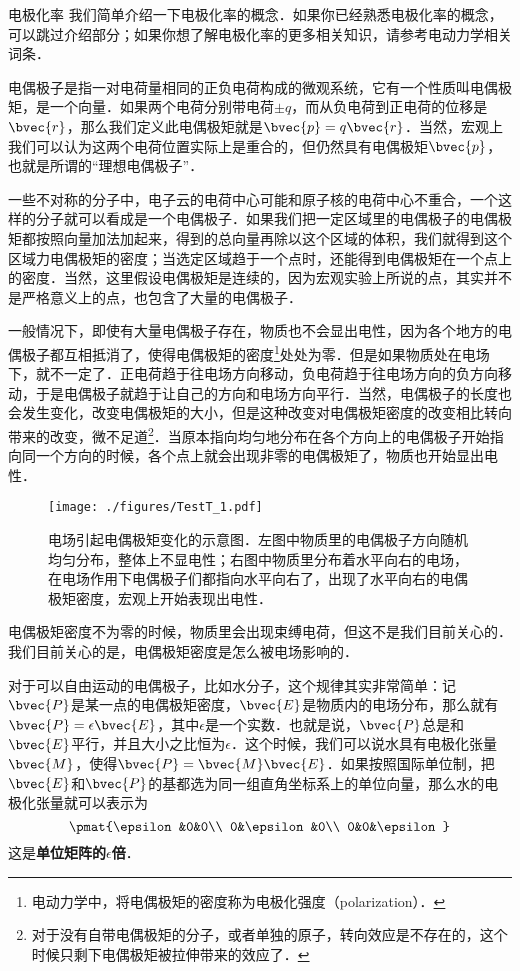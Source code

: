 \begin{example}{电极化率}
我们简单介绍一下电极化率的概念．如果你已经熟悉电极化率的概念，可以跳过介绍部分；如果你想了解电极化率的更多相关知识，请参考电动力学相关词条．

电偶极子是指一对电荷量相同的正负电荷构成的微观系统，它有一个性质叫电偶极矩，是一个向量．如果两个电荷分别带电荷$\pm q$，而从负电荷到正电荷的位移是$\bvec{r}$，那么我们定义此电偶极矩就是$\bvec{p}=q\bvec{r}$．当然，宏观上我们可以认为这两个电荷位置实际上是重合的，但仍然具有电偶极矩$\bvec{p}$，也就是所谓的“理想电偶极子”．

一些不对称的分子中，电子云的电荷中心可能和原子核的电荷中心不重合，一个这样的分子就可以看成是一个电偶极子．如果我们把一定区域里的电偶极子的电偶极矩都按照向量加法加起来，得到的总向量再除以这个区域的体积，我们就得到这个区域力电偶极矩的密度；当选定区域趋于一个点时，还能得到电偶极矩在一个点上的密度．当然，这里假设电偶极矩是连续的，因为宏观实验上所说的点，其实并不是严格意义上的点，也包含了大量的电偶极子．

一般情况下，即使有大量电偶极子存在，物质也不会显出电性，因为各个地方的电偶极子都互相抵消了，使得电偶极矩的密度\footnote{电动力学中，将电偶极矩的密度称为电极化强度（polarization）．}处处为零．但是如果物质处在电场下，就不一定了．正电荷趋于往电场方向移动，负电荷趋于往电场方向的负方向移动，于是电偶极子就趋于让自己的方向和电场方向平行．当然，电偶极子的长度也会发生变化，改变电偶极矩的大小，但是这种改变对电偶极矩密度的改变相比转向带来的改变，微不足道\footnote{对于没有自带电偶极矩的分子，或者单独的原子，转向效应是不存在的，这个时候只剩下电偶极矩被拉伸带来的效应了．}．当原本指向均匀地分布在各个方向上的电偶极子开始指向同一个方向的时候，各个点上就会出现非零的电偶极矩了，物质也开始显出电性．




\begin{figure}[ht]
\centering
\texttt{[image: ./figures/TestT\_1.pdf]}
\caption{电场引起电偶极矩变化的示意图．左图中物质里的电偶极子方向随机均匀分布，整体上不显电性；右图中物质里分布着水平向右的电场，在电场作用下电偶极子们都指向水平向右了，出现了水平向右的电偶极矩密度，宏观上开始表现出电性．} \label{TestT_fig1}
\end{figure}




电偶极矩密度不为零的时候，物质里会出现束缚电荷，但这不是我们目前关心的．我们目前关心的是，电偶极矩密度是怎么被电场影响的．

对于可以自由运动的电偶极子，比如水分子，这个规律其实非常简单：记$\bvec{P}$是某一点的电偶极矩密度，$\bvec{E}$是物质内的电场分布，那么就有$\bvec{P}=\epsilon\bvec{E}$，其中$\epsilon$是一个实数．也就是说，$\bvec{P}$总是和$\bvec{E}$平行，并且大小之比恒为$\epsilon$．这个时候，我们可以说水具有电极化张量$\bvec{M}$，使得$\bvec{P}=\bvec{M}\bvec{E}$．如果按照国际单位制，把$\bvec{E}$和$\bvec{P}$的基都选为同一组直角坐标系上的单位向量，那么水的电极化张量就可以表示为
\begin{equation}
\pmat{\epsilon&0&0\\ 0&\epsilon&0\\ 0&0&\epsilon}
\end{equation}
这是\textbf{单位矩阵的$\epsilon$倍}．


\end{example}
